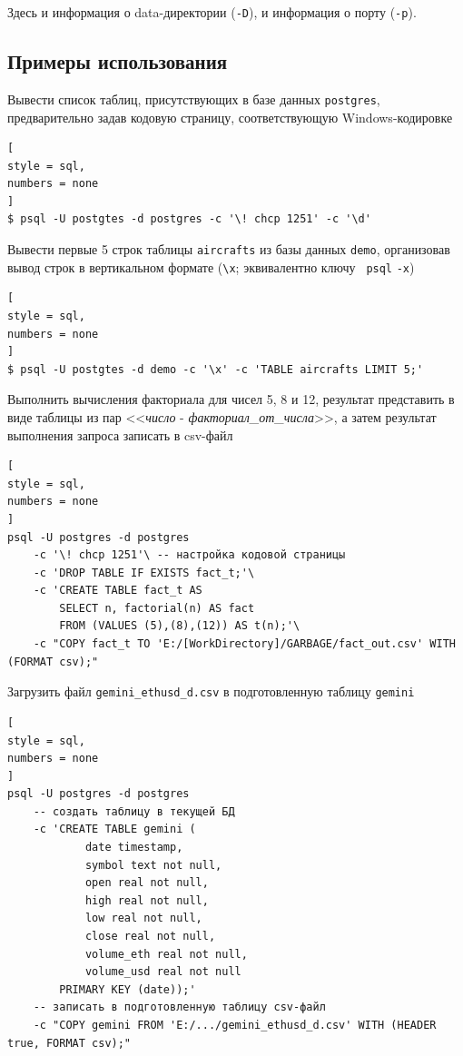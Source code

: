 \documentclass[%
	11pt,
	a4paper,
	utf8,
		]{article}
\begin{document}
Здесь и информация о data-директории (\verb|-D|), и информация о порту (\verb|-p|). 



\subsection{Примеры использования}

Вывести список таблиц, присутствующих в базе данных \texttt{postgres}, предварительно задав кодовую страницу, соответствующую Windows-кодировке
\begin{lstlisting}[
style = sql,
numbers = none
]
$ psql -U postgtes -d postgres -c '\! chcp 1251' -c '\d'
\end{lstlisting}

Вывести первые 5 строк таблицы \texttt{aircrafts} из базы данных \texttt{demo}, организовав вывод строк в вертикальном формате (\verb|\x|; эквивалентно ключу \texttt{ psql} \verb|-x|)
\begin{lstlisting}[
style = sql,
numbers = none
]
$ psql -U postgtes -d demo -c '\x' -c 'TABLE aircrafts LIMIT 5;'
\end{lstlisting}

Выполнить вычисления факториала для чисел 5, 8 и 12, результат представить в виде таблицы из пар <<\emph{число} - \emph{факториал\_от\_числа}>>, а затем результат выполнения запроса записать в csv-файл
\begin{lstlisting}[
style = sql,
numbers = none
]
psql -U postgres -d postgres
    -c '\! chcp 1251'\ -- настройка кодовой страницы
    -c 'DROP TABLE IF EXISTS fact_t;'\
    -c 'CREATE TABLE fact_t AS
        SELECT n, factorial(n) AS fact
        FROM (VALUES (5),(8),(12)) AS t(n);'\
    -c "COPY fact_t TO 'E:/[WorkDirectory]/GARBAGE/fact_out.csv' WITH (FORMAT csv);"
\end{lstlisting}

Загрузить файл \texttt{gemini\_ethusd\_d.csv} в подготовленную таблицу \texttt{gemini}
\begin{lstlisting}[
style = sql,
numbers = none
]
psql -U postgres -d postgres
    -- создать таблицу в текущей БД
    -c 'CREATE TABLE gemini ( 
            date timestamp,
            symbol text not null,
            open real not null,
            high real not null,
            low real not null,
            close real not null,
            volume_eth real not null,
            volume_usd real not null
        PRIMARY KEY (date));'
    -- записать в подготовленную таблицу csv-файл
    -c "COPY gemini FROM 'E:/.../gemini_ethusd_d.csv' WITH (HEADER true, FORMAT csv);"
\end{lstlisting}
\end{document}
